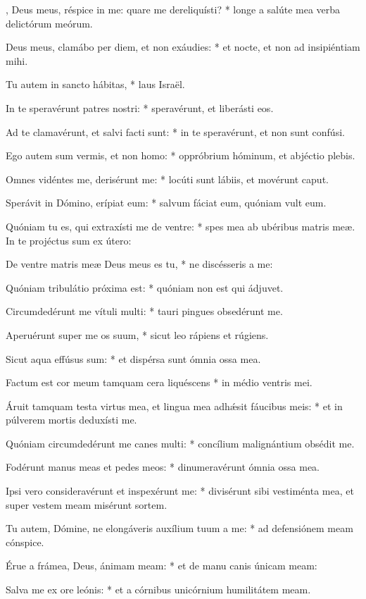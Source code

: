 \begin{psalmus}

, Deus meus, réspice in me: quare me dereliquísti? * longe a salúte mea verba delictórum meórum.

Deus meus, clamábo per diem, et non exáudies: * et nocte, et non ad insipiéntiam mihi.

Tu autem in sancto hábitas, * laus Israël.

In te speravérunt patres nostri: * speravérunt, et liberásti eos.

Ad te clamavérunt, et salvi facti sunt: * in te speravérunt, et non sunt confúsi.

Ego autem sum vermis, et non homo: * oppróbrium hóminum, et abjéctio plebis.

Omnes vidéntes me, derisérunt me: * locúti sunt lábiis, et movérunt caput.

Sperávit in Dómino, erípiat eum: * salvum fáciat eum, quóniam vult eum.

Quóniam tu es, qui extraxísti me de ventre: * spes mea ab ubéribus matris meæ. In te projéctus sum ex útero:

De ventre matris meæ Deus meus es tu, * ne discésseris a me:

Quóniam tribulátio próxima est: * quóniam non est qui ádjuvet.

Circumdedérunt me vítuli multi: * tauri pingues obsedérunt me.

Aperuérunt super me os suum, * sicut leo rápiens et rúgiens.

Sicut aqua effúsus sum: * et dispérsa sunt ómnia ossa mea.

Factum est cor meum tamquam cera liquéscens * in médio ventris mei.

Áruit tamquam testa virtus mea, et lingua mea adhǽsit fáucibus meis: * et in púlverem mortis deduxísti me.

Quóniam circumdedérunt me canes multi: * concílium malignántium obsédit me.

Fodérunt manus meas et pedes meos: * dinumeravérunt ómnia ossa mea.

Ipsi vero consideravérunt et inspexérunt me: * divisérunt sibi vestiménta mea, et super vestem meam misérunt sortem.

Tu autem, Dómine, ne elongáveris auxílium tuum a me: * ad defensiónem meam cónspice.

Érue a frámea, Deus, ánimam meam: * et de manu canis únicam meam:

Salva me ex ore leónis: * et a córnibus unicórnium humilitátem meam.


\end{psalmus}

